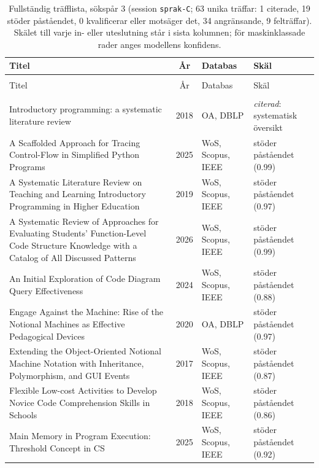 \begingroup\footnotesize
\begin{longtable}{@{}%
  >{\raggedright\arraybackslash}p{}c%
  >{\raggedright\arraybackslash}p{}%
  >{\raggedright\arraybackslash}p{}@{}}
\caption{Fullständig träfflista, sökspår 3 (session \texttt{sprak-C}; 63 unika träffar: 1 citerade, 19 stöder påståendet, 0 kvalificerar eller motsäger det, 34 angränsande, 9 felträffar).  Skälet till varje in- eller uteslutning står i sista kolumnen; för maskinklassade rader anges modellens konfidens.}\label{tab:sok-C}\\
\toprule
Titel & År & Databas & Skäl \\
\midrule
\endfirsthead
\multicolumn{4}{@{}l}{\emph{\tablename~\thetable{} (forts.)}}\\
\toprule Titel & År & Databas & Skäl \\ \midrule
\endhead
\midrule \multicolumn{4}{r@{}}{\emph{forts.\ på nästa sida}}\\
\endfoot
\bottomrule
\endlastfoot
Introductory programming: a systematic literature review & 2018 & OA, DBLP & \emph{citerad}: systematisk översikt \\
A Scaffolded Approach for Tracing Control-Flow in Simplified Python Programs & 2025 & WoS, Scopus, IEEE & stöder påståendet (0.99) \\
A Systematic Literature Review on Teaching and Learning Introductory Programming in Higher Education & 2019 & WoS, Scopus, IEEE & stöder påståendet (0.97) \\
A Systematic Review of Approaches for Evaluating Students' Function-Level Code Structure Knowledge with a Catalog of All Discussed Patterns & 2026 & WoS, Scopus, IEEE & stöder påståendet (0.99) \\
An Initial Exploration of Code Diagram Query Effectiveness & 2024 & WoS, Scopus, IEEE & stöder påståendet (0.88) \\
Engage Against the Machine: Rise of the Notional Machines as Effective Pedagogical Devices & 2020 & OA, DBLP & stöder påståendet (0.97) \\
Extending the Object-Oriented Notional Machine Notation with Inheritance, Polymorphism, and GUI Events & 2017 & WoS, Scopus, IEEE & stöder påståendet (0.87) \\
Flexible Low-cost Activities to Develop Novice Code Comprehension Skills in Schools & 2018 & WoS, Scopus, IEEE & stöder påståendet (0.86) \\
Main Memory in Program Execution: Threshold Concept in CS & 2025 & WoS, Scopus, IEEE & stöder påståendet (0.92) \\

\end{longtable}
